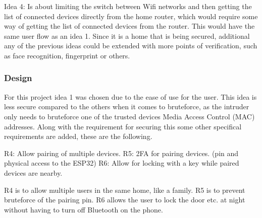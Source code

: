 Idea 4: Is about limiting the switch between Wifi networks and then getting the list of connected devices directly from the home router, which would require some way of getting the list of connected devices from the router. This would have the same user flow as an idea 1. Since it is a home that is being secured, additional any of the previous ideas could be extended with more points of verification, such as face recognition, fingerprint or others.

\subsubsection{Design}
For this project idea 1 was chosen due to the ease of use for the user. This idea is less secure compared to the others when it comes to bruteforce, as the intruder only needs to bruteforce one of the trusted devices Media Access Control (MAC) addresses. Along with the requirement for securing this some other specifical requirements are added, these are the following.

R4: Allow pairing of multiple devices.
R5: 2FA for pairing devices. (pin and physical access to the ESP32)
R6: Allow for locking with a key while paired devices are nearby.

R4 is to allow multiple users in the same home, like a family. R5 is to prevent bruteforce of the pairing pin. R6 allows the user to lock the door etc. at night without having to turn off Bluetooth on the phone.